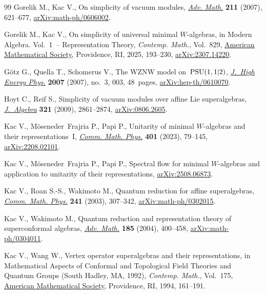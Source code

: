 \documentclass[10pt,a4paper]{amsart}
\numberwithin{equation}{section}
\begin{document}
\begin{thebibliography}{99}
Gorelik M., Kac V., On simplicity of vacuum modules,
 \href{https://doi.org/10.1016/j.aim.2006.09.004}{\textit{Adv. Math.}}
 \textbf{211} (2007), 621--677,
 \href{http://arxiv.org/abs/math-ph/0606002}{arXiv:math-ph/0606002}.

Gorelik M., Kac V., On simplicity of universal minimal {$W$}-algebras, in
 Modern {A}lgebra. {V}ol.~1~-- {R}epresentation {T}heory, \textit{Contemp.
 Math.}, Vol.~829, \href{https://doi.org/10.1090/conm/829/16549}{American
 Mathematical Society}, Providence, RI, 2025, 193--230,
 \href{http://arxiv.org/abs/2307.14220}{arXiv:2307.14220}.

G\"otz G., Quella T., Schomerus V., The {WZNW} model on~{${\rm PSU}(1,1|2)$},
 \href{https://doi.org/10.1088/1126-6708/2007/03/003}{\textit{J.~High Energy
 Phys.}} \textbf{2007} (2007), no.~3, 003, 48~pages,
 \href{http://arxiv.org/abs/hep-th/0610070}{arXiv:hep-th/0610070}.

Hoyt C., Reif S., Simplicity of vacuum modules over affine {L}ie superalgebras,
 \href{https://doi.org/10.1016/j.jalgebra.2009.02.003}{\textit{J.~Algebra}}
 \textbf{321} (2009), 2861--2874,
 \href{http://arxiv.org/abs/0806.2605}{arXiv:0806.2605}.

Kac V., M\"oseneder~Frajria P., Papi P., Unitarity of minimal {$W$}-algebras
 and their representations~{I},
 \href{https://doi.org/10.1007/s00220-023-04637-5}{\textit{Comm. Math. Phys.}}
 \textbf{401} (2023), 79--145,
 \href{http://arxiv.org/abs/2208.02101}{arXiv:2208.02101}.

Kac V., M\"oseneder~Frajria P., Papi P., Spectral flow for minimal
 {$W$}-algebras and application to unitarity of their representations,
 \href{http://arxiv.org/abs/2508.06873}{arXiv:2508.06873}.

Kac V., Roan S.-S., Wakimoto M., Quantum reduction for affine superalgebras,
 \href{https://doi.org/10.1007/s00220-003-0926-1}{\textit{Comm. Math. Phys.}}
 \textbf{241} (2003), 307--342,
 \href{http://arxiv.org/abs/math-ph/0302015}{arXiv:math-ph/0302015}.

Kac V., Wakimoto M., Quantum reduction and representation theory of
 superconformal algebras,
 \href{https://doi.org/10.1016/j.aim.2003.12.005}{\textit{Adv. Math.}}
 \textbf{185} (2004), 400--458,
 \href{http://arxiv.org/abs/math-ph/0304011}{arXiv:math-ph/0304011}.

Kac V., Wang W., Vertex operator superalgebras and their representations, in
 Mathematical {A}spects of {C}onformal and {T}opological {F}ield {T}heories
 and {Q}uantum {G}roups ({S}outh {H}adley, {MA}, 1992), \textit{Contemp.
 Math.}, Vol.~175, \href{https://doi.org/10.1090/conm/175/01843}{American
 Mathematical Society}, Providence, RI, 1994, 161--191.


\end{thebibliography}
\end{document}
